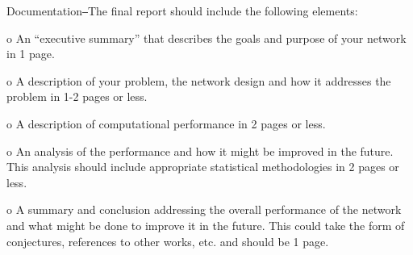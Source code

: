 Documentation⎯The final report should include the following elements:

o An “executive summary” that describes the goals and purpose of your
network in 1 page.

o A description of your problem, the network design and how it addresses
the problem in 1-2 pages or less.

o A description of computational performance in 2 pages or less.

o An analysis of the performance and how it might be improved in the
future. This analysis should include appropriate statistical methodologies
in 2 pages or less.

o A summary and conclusion addressing the overall performance of the
network and what might be done to improve it in the future. This could
take the form of conjectures, references to other works, etc. and should be
1 page.